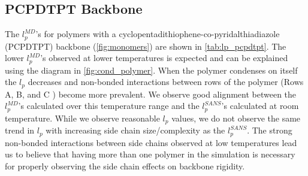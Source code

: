 \subsection{PCPDTPT Backbone}
The $l_p^{MD}$'s for polymers with a cyclopentadithiophene-co-pyridalthiadiazole (PCPDTPT) backbone (\autoref{fig:monomers}) are shown in \autoref{tab:lp_pcpdtpt}. The lower $l_p^{MD}$'s observed at lower temperatures is expected and can be explained using the diagram in \autoref{fig:cond_polymer}. When the polymer condenses on itself the $l_p$ decreases and non-bonded interactions between rows of the polymer (Rows A, B, and C ) become more prevalent. We observe good alignment between the $l_p^{MD}$'s calculated over this temperature range and the $l_p^{SANS}$'s calculated at room temperature. While we observe reasonable $l_p$ values, we do not observe the same trend in $l_p$ with increasing side chain size/complexity as the  $l_p^{SANS}$. The strong non-bonded interactions between side chains observed at low temperatures lead us to believe that having more than one polymer in the simulation is necessary for properly observing the side chain effects on backbone rigidity. 

